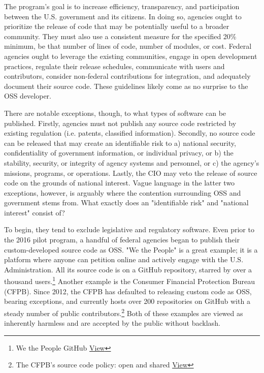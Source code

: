 \documentclass[a4paper]{article}
\begin{document}
The program's goal is to increase efficiency, transparency, and participation between the U.S. government and its citizens. In doing so, agencies ought to prioritize the release of code that may be potentially useful to a broader community. They must also use a consistent measure for the specified 20\% minimum, be that number of lines of code, number of modules, or cost. Federal agencies ought to leverage the existing communities, engage in open development practices, regulate their release schedules, communicate with users and contributors, consider non-federal contributions for integration, and adequately document their source code. These guidelines likely come as no surprise to the OSS developer.

There are notable exceptions, though, to what types of software can be published. Firstly, agencies must not publish any source code restricted by existing regulation (i.e. patents, classified information). Secondly, no source code can be released that may create an identifiable risk to a) national security, confidentiality of government information, or individual privacy, or b) the stability, security, or integrity of agency systems and personnel, or c) the agency's missions, programs, or operations. Lastly, the CIO may veto the release of source code on the grounds of national interest. Vague language in the latter two exceptions, however, is arguably where the contention surrounding OSS and government stems from. What exactly does an "identifiable risk" and "national interest" consist of?

\qquad To begin, they tend to exclude legislative and regulatory software. Even prior to the 2016 pilot program, a handful of federal agencies began to publish their custom-developed source code as OSS. "We the People" is a great example; it is a platform where anyone can petition online and actively engage with the U.S. Administration. All its source code is on a GitHub repository, starred by over a thousand users.\footnote{We the People GitHub \href{https://github.com/WhiteHouse/petitions}{View}} Another example is the Consumer Financial Protection Bureau (CFPB). Since 2012, the CFPB has defaulted to releasing custom code as OSS, bearing exceptions, and currently hosts over 200 repositories on GitHub with a steady number of public contributors.\footnote{The CFPB’s source code policy: open and shared \href{https://www.consumerfinance.gov/about-us/blog/the-cfpbs-source-code-policy-open-and-shared/}{View}} Both of these examples are viewed as inherently harmless and are accepted by the public without backlash.
\end{document}
